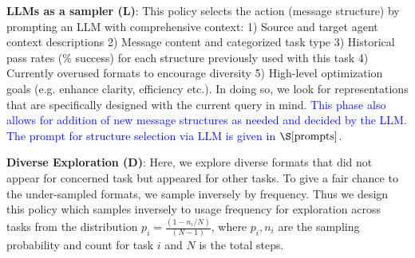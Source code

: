 \noindent \textbf{LLMs as a sampler (L)}: This policy selects the action (message structure) by prompting an LLM with comprehensive context:
1) Source and target agent context descriptions
2) Message content and categorized task type
3) Historical pass rates (\% success) for each structure previously used with this task
4) Currently overused formats to encourage diversity
5) High-level optimization goals (e.g. enhance clarity, efficiency etc.).
In doing so, we look for representations that are specifically designed with the current query in mind. 
\textcolor{blue}{This phase also allows for addition of new message structures as needed and decided by the LLM.
The prompt for structure selection via LLM is given in $\S \ref{prompts}$.}

\noindent \textbf{Diverse Exploration (D)}: 
Here, we explore diverse formats that did not appear for concerned task but appeared for other tasks. To give a fair chance to the under-sampled formats, we sample inversely by frequency.
Thus we design this policy which samples inversely to usage frequency for exploration across tasks from the distribution $p_i = \frac{(1- n_i/N)}{(N-1)}$, 
where $p_i, n_i$ are the sampling probability and count for task $i$ and $N$ is the total steps. 

